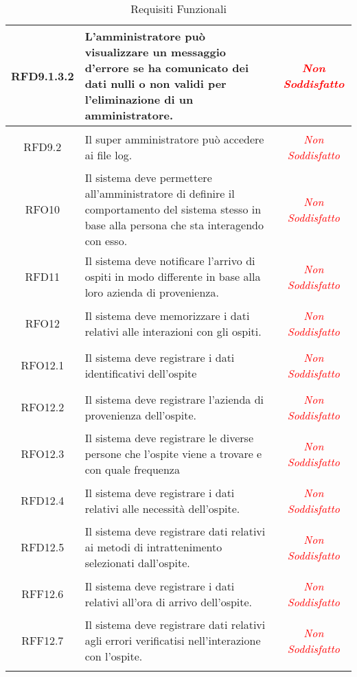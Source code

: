 \begin{longtable}{|c|>{\centering}m{7cm}|c|}
\hypertarget{RFD9.1.3.2}{RFD9.1.3.2} & L'amministratore può visualizzare un messaggio d'errore se ha comunicato dei dati nulli o non validi per l'eliminazione di un amministratore. & \textcolor{Red}{\textit{Non Soddisfatto}}\\ \hline

\hypertarget{RFD9.2}{RFD9.2} & Il super amministratore può accedere ai file log. & \textcolor{Red}{\textit{Non Soddisfatto}}\\ \hline

\hypertarget{RFO10}{RFO10} & Il sistema deve permettere all'amministratore di definire il comportamento del sistema stesso in base alla persona che sta interagendo con esso. & \textcolor{Red}{\textit{Non Soddisfatto}}\\ \hline

\hypertarget{RFD11}{RFD11} & Il sistema deve notificare l'arrivo di ospiti in modo differente in base alla loro azienda di provenienza. & \textcolor{Red}{\textit{Non Soddisfatto}}\\ \hline

\hypertarget{RFO12}{RFO12} & Il sistema deve memorizzare i dati relativi alle interazioni con gli ospiti. & \textcolor{Red}{\textit{Non Soddisfatto}}\\ \hline

\hypertarget{RFO12.1}{RFO12.1} & Il sistema deve registrare i dati identificativi dell'ospite & \textcolor{Red}{\textit{Non Soddisfatto}}\\ \hline

\hypertarget{RFO12.2}{RFO12.2} & Il sistema deve registrare l'azienda di provenienza dell'ospite. & \textcolor{Red}{\textit{Non Soddisfatto}}\\ \hline

\hypertarget{RFO12.3}{RFO12.3} & Il sistema deve registrare le diverse persone che l'ospite viene a trovare e con quale frequenza & \textcolor{Red}{\textit{Non Soddisfatto}}\\ \hline

\hypertarget{RFD12.4}{RFD12.4} & Il sistema deve registrare i dati relativi alle necessità  dell'ospite. & \textcolor{Red}{\textit{Non Soddisfatto}}\\ \hline

\hypertarget{RFD12.5}{RFD12.5} & Il sistema deve registrare dati relativi ai metodi di intrattenimento selezionati dall'ospite. & \textcolor{Red}{\textit{Non Soddisfatto}}\\ \hline

\hypertarget{RFF12.6}{RFF12.6} & Il sistema deve registrare i dati relativi all'ora di arrivo dell'ospite. & \textcolor{Red}{\textit{Non Soddisfatto}}\\ \hline

\hypertarget{RFF12.7}{RFF12.7} & Il sistema deve registrare dati relativi agli errori verificatisi nell'interazione con l'ospite. & \textcolor{Red}{\textit{Non Soddisfatto}}\\ \hline

\caption[Requisiti Funzionali]{Requisiti Funzionali}
\label{tabella:req0}
\end{longtable}
\clearpage
